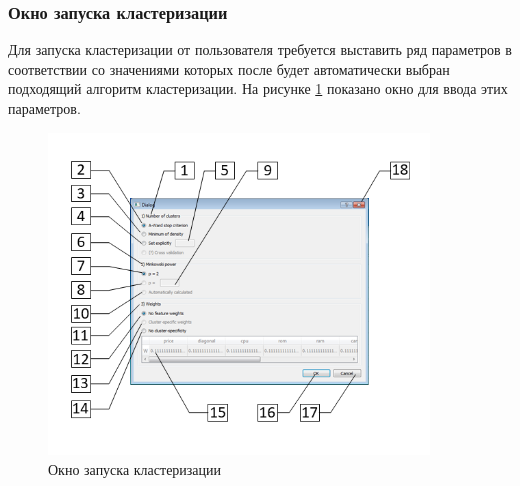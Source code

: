 \documentclass[12pt,tikz]{instruction}
\begin{document}
\subsubsection{Окно запуска кластеризации}

Для запуска кластеризации от пользователя требуется выставить ряд параметров в соответствии со значениями которых после будет автоматически выбран подходящий алгоритм кластеризации. На рисунке \ref{fig:runclusteringwindow} показано окно для ввода этих параметров.

\begin{figure}[h!]
	\centering
	\includegraphics[width=0.9\textwidth]{img/runclusteringwindow}
	\caption{Окно запуска кластеризации}
	\label{fig:runclusteringwindow}
\end{figure}
\end{document}
